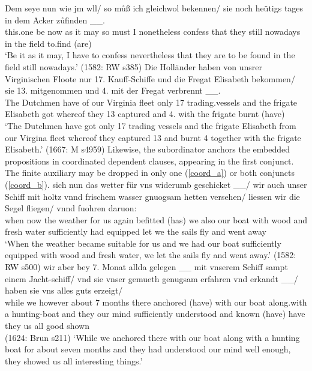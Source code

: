\documentclass[output=paper,colorlinks,citecolor=brown]{langscibook}
\begin{document}
\eal
\ex \label{subordinator_a}
\gll Dem seye nun wie jm w\oldoe{}ll/ so m\r{u}ß ich gleichwol bekennen/  sie noch {heütigs tages} in dem Acker z\r{u}finden \_\_. \\ this.one be now as it may so must I nonetheless confess that they still nowadays in the field to.find (are) \\ 
\glt `Be it as it may, I have to confess nevertheless that they are to be found in the field still nowadays.' \hfill (1582: RW s385)
\ex \label{subordinator_b}
\gll Die Holländer haben von unsrer Virginischen Floote nur 17. Kauff-Schiffe und die Fregat Elisabeth bekommen/  sie 13. mitgenommen und 4. mit der Fregat verbrennt \_\_. \\ The Dutchmen have of our Virginia fleet only 17 trading.vessels and the frigate Elisabeth got whereof they 13 captured and 4. with the frigate burnt (have)  \\ 
\glt `The Dutchmen have got only 17 trading vessels and the frigate Elisabeth from our Virgina fleet whereof they captured 13 and burnt 4 together with the frigate Elisabeth.' \hfill (1667: M s4959)
\zl
Likewise, the subordinator anchors the embedded propositions in coordinated dependent clauses, appearing in the first conjunct. The finite auxiliary may be dropped in only one (\ref{coord_a}) or both conjuncts (\ref{coord_b}).
\eal
\ex \label{coord_a}
\gll {} sich nun das wetter für vns widerumb geschicket \_\_/ wir auch unser Schiff mit holtz vnnd frischem wasser gnuogsam hetten versehen/ liessen wir die Segel fliegen/ vnnd fuohren daruon:  \\  when  now the weather for us again befitted (has) we also our boat with wood and fresh water sufficiently had equipped let we the sails fly and went away   \\ 
\glt `When the weather became suitable for us and we had our boat sufficiently equipped with wood and fresh water, we let the sails fly and went away.'  \hfill (1582: RW s500)
\ex \label{coord_b}
\gll {} wir aber bey 7. Monat allda gelegen \_\_ mit vnserem Schiff sampt einem Jacht-schiff/ vnd sie vnser gemueth genugsam erfahren vnd erkandt \_\_/ haben sie vns alles guts erzeigt/ \\ while we however about 7 months there anchored (have) with our boat along.with a hunting-boat and they our mind sufficiently understood and known (have) have they us all good shown \\  \hfill (1624: Brun s211)
\glt `While we anchored there with our boat along with a hunting boat for about seven months and they had understood our mind well enough, they showed us all interesting things.'
\zl
\end{document}
